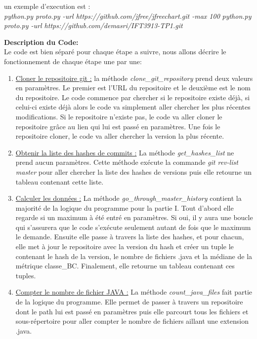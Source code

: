 \documentclass[11pt]{article}
\begin{document}
un exemple d'execution est :\\
\textit{python.py proto.py -url https://github.com/jfree/jfreechart.git -max 100}
\textit{python.py proto.py -url https://github.com/demasri/IFT3913-TP1.git}
 
\textbf{Description du Code: }\\

Le code est bien s\'epar\'e pour chaque \'etape a suivre, nous allons d\'ecrire le fonctionnement de chaque \'etape une par une:

\begin{enumerate}
	\item \underline{Cloner le repositoire git :} la m\'ethode \textit{clone\_git\_repository} prend deux valeurs en param\`etres. Le premier est l’URL du repositoire et le deuxi\`eme est le nom du repositoire. Le code commence par chercher si le repositoire existe déjà, si celui-ci existe d\'ej\`a alors le code va simplement aller chercher les plus r\'ecentes modifications. Si le repositoire n’existe pas, le code va aller cloner le repositoire gr\^ace au lien qui lui est pass\'e en param\`etres. Une fois le repositoire cloner, le code va aller chercher la version la plus r\'ecente.
	\item \underline{Obtenir la liste des hashes de commits :} La m\'ethode \textit{get\_hashes\_list} ne prend aucun paramètres. Cette m\'ethode ex\'ecute la commande \textit{git rev-list master} pour aller chercher la liste des hashes de versions puis elle retourne un tableau contenant cette liste.
	\item \underline{Calculer les donn\'ees :} La m\'ethode \textit{go\_through\_master\_history} contient la majorit\'e de la logique du programme pour la partie I. Tout d’abord elle regarde si un maximum \`a \'et\'e entr\'e en param\`etres. Si oui, il y aura une boucle qui s’assurera que le code s’ex\'ecute seulement autant de fois que le maximum le demande. Ensuite elle passe \`a travers la liste des hashes, et pour chacun, elle met à jour le repositoire avec la version du hash et créer un tuple le contenant le hash de la version, le nombre de fichiers .java et la médiane de la métrique classe\_BC. Finalement, elle retourne un tableau contenant ces tuples.
	\item \underline{Compter le nombre de fichier JAVA :} La m\'ethode \textit{count\_java\_files} fait partie de la logique du programme. Elle permet de passer \`a travers un repositoire dont le path lui est pass\'e en param\`etres puis elle parcourt tous les fichiers et sous-répertoire pour aller compter le nombre de fichiers aillant une extension .java.

\end{enumerate}
\end{document}

